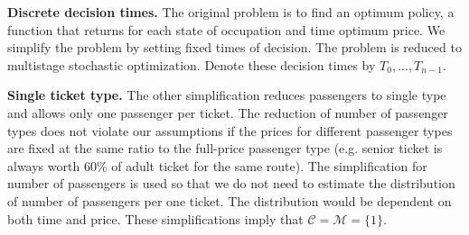 \textbf{Discrete decision times.}
The original problem is to find an optimum policy, a function that returns for each state of occupation and time optimum price. We simplify the problem by setting fixed times of decision. The problem is reduced to multistage stochastic optimization. Denote these decision times by $T_0, ..., T_{n-1}$.

\textbf{Single ticket type.}
The other simplification reduces passengers to single type and allows only one passenger per ticket. The reduction of number of passenger types does not violate our assumptions if the prices for different passenger types are fixed at the same ratio to the full-price passenger type (e.g. senior ticket is always worth 60\% of adult ticket for the same route). The simplification for number of passengers is used so that we do not need to estimate the distribution of number of passengers per one ticket. The distribution would be dependent on both time and price. These simplifications imply that $\mathcal{C} = \mathcal{M} = \{ 1 \}$.
